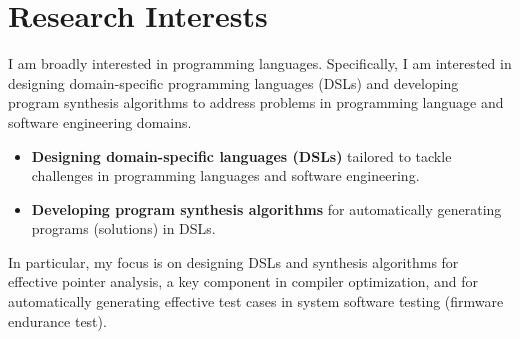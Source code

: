 \documentclass[letterpaper,11pt]{article}
\begin{document}
\section{Research Interests}
I am broadly interested in programming languages.
Specifically, I am interested in designing domain-specific programming languages (DSLs) and developing program synthesis algorithms to address problems in programming language and software engineering domains.
%
%
\begin{itemize}
  \item \textbf{Designing domain-specific languages (DSLs)} tailored to tackle challenges in programming languages and software engineering. 
  \item \textbf{Developing program synthesis algorithms} for automatically generating programs (solutions) in DSLs.
\end{itemize}
In particular, my focus is on designing DSLs and synthesis algorithms for effective pointer analysis, a key component in compiler optimization, and for automatically generating effective test cases in system software testing (firmware endurance test).









\end{document}
